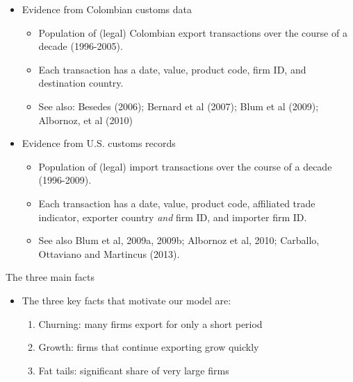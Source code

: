 \documentclass[notes=show]{beamer}
\begin{document}
\begin{frame}%


\begin{itemize}
\item Evidence from Colombian customs data

\begin{itemize}
\item Population of (legal) Colombian export transactions over the course of
a decade (1996-2005).

\item Each transaction has a date, value, product code, firm ID, and
destination country.

\item See also: Besedes (2006); Bernard et al (2007); Blum et al (2009);
Albornoz, et al (2010)
\end{itemize}

\item Evidence from U.S. customs records

\begin{itemize}
\item Population of (legal) import transactions over the course of a decade
(1996-2009).

\item Each transaction has a date, value, product code, affiliated trade
indicator, exporter country \textit{and} firm ID, and importer firm ID.

\item See also Blum et al, 2009a, 2009b; Albornoz et al, 2010; Carballo,
Ottaviano and Martincus (2013).
\end{itemize}
\end{itemize}

\end{frame}%

\begin{frame}{The three main facts}

    \begin{itemize}
        \item The three key facts that motivate our model are:
        \begin{enumerate}
            \item Churning: many firms export for only a short period
            \item Growth: firms that continue exporting grow quickly
            \item Fat tails: significant share of very large firms
        \end{enumerate}
    \end{itemize}

\end{frame}
\end{document}
